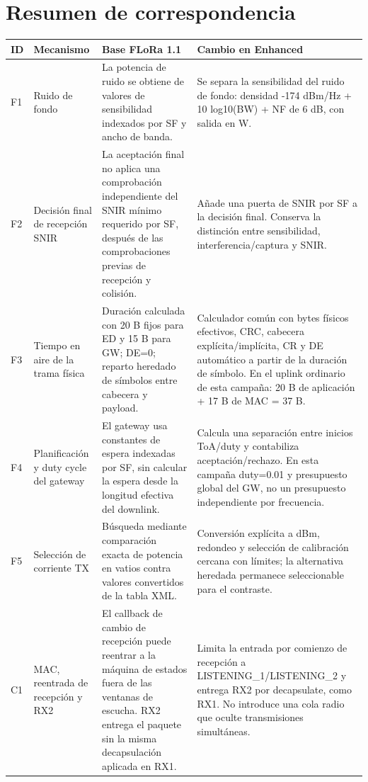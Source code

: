 \documentclass[10pt,a4paper]{article}
\begin{document}
\section*{Resumen de correspondencia}
\small\begin{longtable}{@{}p{0.65cm}p{3.0cm}p{6.1cm}p{6.0cm}@{}}
\toprule ID & Mecanismo & Base FLoRa 1.1 & Cambio en Enhanced\\\midrule\endhead

F1 & Ruido de fondo & La potencia de ruido se obtiene de valores de sensibilidad indexados por SF y ancho de banda. & Se separa la sensibilidad del ruido de fondo: densidad -174 dBm/Hz + 10 log10(BW) + NF de 6 dB, con salida en W.\\[5pt]
F2 & Decisión final de recepción SNIR & La aceptación final no aplica una comprobación independiente del SNIR mínimo requerido por SF, después de las comprobaciones previas de recepción y colisión. & Añade una puerta de SNIR por SF a la decisión final. Conserva la distinción entre sensibilidad, interferencia/captura y SNIR.\\[5pt]
F3 & Tiempo en aire de la trama física & Duración calculada con 20 B fijos para ED y 15 B para GW; DE=0; reparto heredado de símbolos entre cabecera y payload. & Calculador común con bytes físicos efectivos, CRC, cabecera explícita/implícita, CR y DE automático a partir de la duración de símbolo. En el uplink ordinario de esta campaña: 20 B de aplicación + 17 B de MAC = 37 B.\\[5pt]
F4 & Planificación y duty cycle del gateway & El gateway usa constantes de espera indexadas por SF, sin calcular la espera desde la longitud efectiva del downlink. & Calcula una separación entre inicios ToA/duty y contabiliza aceptación/rechazo. En esta campaña duty=0.01 y presupuesto global del GW, no un presupuesto independiente por frecuencia.\\[5pt]
F5 & Selección de corriente TX & Búsqueda mediante comparación exacta de potencia en vatios contra valores convertidos de la tabla XML. & Conversión explícita a dBm, redondeo y selección de calibración cercana con límites; la alternativa heredada permanece seleccionable para el contraste.\\[5pt]
C1 & MAC, reentrada de recepción y RX2 & El callback de cambio de recepción puede reentrar a la máquina de estados fuera de las ventanas de escucha. RX2 entrega el paquete sin la misma decapsulación aplicada en RX1. & Limita la entrada por comienzo de recepción a LISTENING\_1/LISTENING\_2 y entrega RX2 por decapsulate, como RX1. No introduce una cola radio que oculte transmisiones simultáneas.\\[5pt]

\end{longtable}
\end{document}
